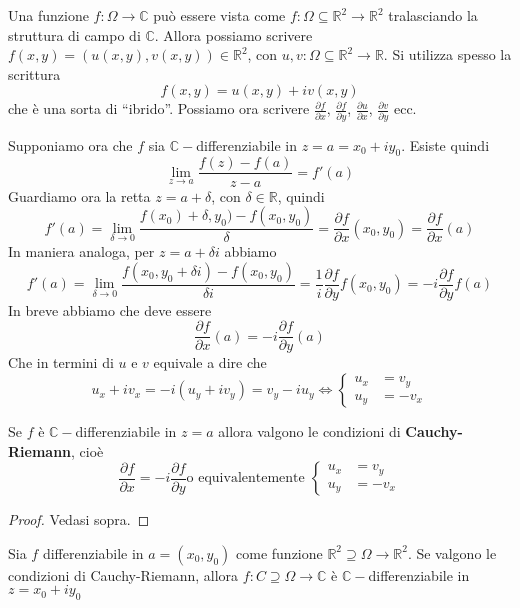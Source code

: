 Una funzione \(f : \Omega \to \mathbb{C}\) può essere vista come \(f : \Omega
\subseteq \mathbb{R}^2 \to \mathbb{R}^2 \) tralasciando la struttura di campo di
\(\mathbb{C}\). Allora possiamo scrivere \(f(x, y) = (u{\left( x, y \right)} ,
v{\left( x, y \right)} ) \in \mathbb{R}^2\), con \(u, v : \Omega \subseteq
\mathbb{R}^2 \to \mathbb{R} \). Si utilizza spesso la scrittura
\[
    f(x, y) = u(x,y) + iv(x,y)
\]
che è una sorta di ``ibrido''.
Possiamo ora scrivere \(\frac{\partial f}{\partial x}\), \(\frac{\partial
f}{\partial y}\), \(\frac{\partial u}{\partial x}\), \(\frac{\partial
v}{\partial y}\) ecc.

Supponiamo ora che \(f\) sia \(\mathbb{C}-\)differenziabile in
\(z=a=x_{0}+iy_{0}\). Esiste quindi
\[
    \lim_{z\to a}  \frac{f(z) - f(a)}{z-a} = f'(a)
\]
Guardiamo ora la retta \(z=a+\delta\), con \(\delta \in \mathbb{R}\), quindi
\[
    f'(a) = \lim_{\delta \to 0} \frac{f(x_{0})+\delta, y_{0}) -
    f(x_{0},y_{0})}{\delta} = \frac{\partial f}{\partial x}(x_{0},y_{0}) =
    \frac{\partial f}{\partial x}(a)
\] 
In maniera analoga, per \(z= a + \delta i\) abbiamo
\[
    f'(a) = \lim_{\delta \to 0} \frac{f(x_{0}, y_{0}+\delta i) -
    f(x_{0},y_{0})}{\delta i} = \frac{1}{i} \frac{\partial f}{\partial
y}f(x_{0},y_{0}) = -i \frac{\partial f}{\partial y}f(a)
\]
In breve abbiamo che deve essere 
\[
    \frac{\partial f}{\partial x}(a) = -i \frac{\partial f}{\partial y}(a)
\]
Che in termini di \(u\) e \(v\) equivale a dire che
\[
    u_x + iv_x = -i {\left( u_y + iv_y \right)} = v_y - iu_y \iff \begin{cases}
        u_x &= v_y \\
        u_y &= -v_x
    \end{cases}
\]
\begin{proposition}
    Se \(f\) è \(\mathbb{C}-\)differenziabile in \(z=a\) allora valgono le
    condizioni di \textbf{Cauchy-Riemann}, cioè
    \[
        \frac{\partial f}{\partial x} = -i \frac{\partial f}{\partial y} \text{
        o equivalentemente } \begin{cases}
        u_x &= v_y \\
        u_y &= -v_x
        \end{cases}
    \]
\end{proposition}
\begin{proof}
    Vedasi sopra.
\end{proof}
\begin{proposition}
    Sia \(f\) differenziabile in \(a = (x_{0}, y_{0})\) come funzione \(\mathbb{R}^2
    \supseteq \Omega \to \mathbb{R}^2 \). Se valgono le condizioni di
    Cauchy-Riemann, allora \(f : C \supseteq \Omega \to \mathbb{C} \) è
    \(\mathbb{C}-\)differenziabile in \(z = x_{0} + iy_{0}\) 
\end{proposition}
